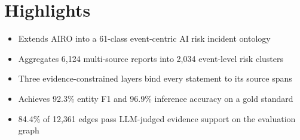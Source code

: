 \documentclass[12pt]{article}
\begin{document}
\section*{Highlights}

\begin{itemize}
\item Extends AIRO into a 61-class event-centric AI risk incident
  ontology
\item Aggregates 6,124 multi-source reports into 2,034 event-level
  risk clusters
\item Three evidence-constrained layers bind every statement to its
  source spans
\item Achieves 92.3\% entity F1 and 96.9\% inference accuracy on a
  gold standard
\item 84.4\% of 12,361 edges pass LLM-judged evidence support on the
  evaluation graph
\end{itemize}
\end{document}
